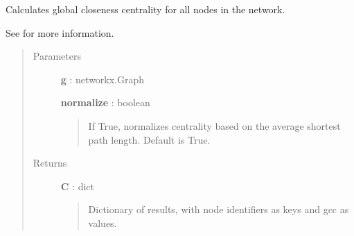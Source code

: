 \documentclass[letterpaper,10pt,english]{sphinxmanual}
\begin{document}

\begin{fulllineitems}
\label{tethne.analyze.graph:tethne.analyze.graph.global_closeness_centrality}
Calculates global closeness centrality for all nodes in the network.

See {\hyperref[tethne.analyze.graph:tethne.analyze.graph.node_global_closeness_centrality]{}} for more information.
\begin{quote}\begin{description}
\item[{Parameters}] \leavevmode
\textbf{g} : networkx.Graph

\textbf{normalize} : boolean
\begin{quote}

If True, normalizes centrality based on the average shortest path
length. Default is True.
\end{quote}

\item[{Returns}] \leavevmode
\textbf{C} : dict
\begin{quote}

Dictionary of results, with node identifiers as keys and gcc as values.
\end{quote}

\end{description}\end{quote}

\end{fulllineitems}

\end{document}
